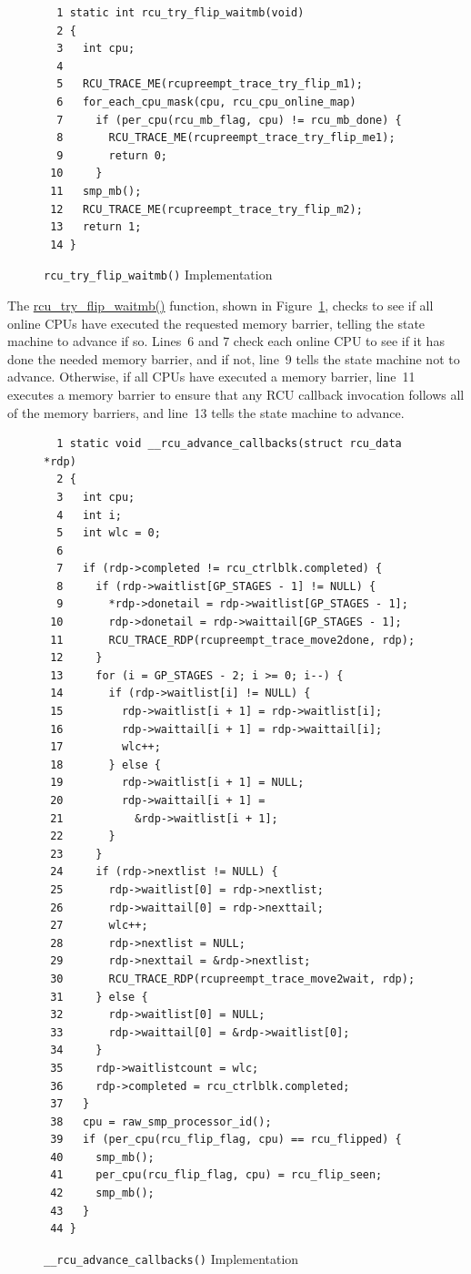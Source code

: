 \begin{figure}[tbp]
{ \scriptsize
\begin{verbatim}
  1 static int rcu_try_flip_waitmb(void)
  2 {
  3   int cpu;
  4
  5   RCU_TRACE_ME(rcupreempt_trace_try_flip_m1);
  6   for_each_cpu_mask(cpu, rcu_cpu_online_map)
  7     if (per_cpu(rcu_mb_flag, cpu) != rcu_mb_done) {
  8       RCU_TRACE_ME(rcupreempt_trace_try_flip_me1);
  9       return 0;
 10     }
 11   smp_mb();
 12   RCU_TRACE_ME(rcupreempt_trace_try_flip_m2);
 13   return 1;
 14 }
\end{verbatim}
}
\caption{{\tt rcu\_try\_flip\_waitmb()} Implementation}
\label{fig:app:rcuimpl:rcu_try_flip_waitmb() Implementation}
\end{figure}

The \url{rcu_try_flip_waitmb()} function, shown in
Figure~\ref{fig:app:rcuimpl:rcu_try_flip_waitmb() Implementation},
checks to see
if all online CPUs have executed the requested memory barrier,
telling the state machine to advance if so.
Lines~6 and 7 check each online CPU to see if it has
done the needed memory barrier, and if not, line~9 tells
the state machine not to advance.
Otherwise, if all CPUs have executed a memory barrier, line~11
executes a memory barrier to ensure that any RCU callback invocation
follows all of the memory barriers, and line~13 tells the
state machine to advance.

\begin{figure}[tbp]
{ \scriptsize
\begin{verbatim}
  1 static void __rcu_advance_callbacks(struct rcu_data *rdp)
  2 {
  3   int cpu;
  4   int i;
  5   int wlc = 0;
  6
  7   if (rdp->completed != rcu_ctrlblk.completed) {
  8     if (rdp->waitlist[GP_STAGES - 1] != NULL) {
  9       *rdp->donetail = rdp->waitlist[GP_STAGES - 1];
 10       rdp->donetail = rdp->waittail[GP_STAGES - 1];
 11       RCU_TRACE_RDP(rcupreempt_trace_move2done, rdp);
 12     }
 13     for (i = GP_STAGES - 2; i >= 0; i--) {
 14       if (rdp->waitlist[i] != NULL) {
 15         rdp->waitlist[i + 1] = rdp->waitlist[i];
 16         rdp->waittail[i + 1] = rdp->waittail[i];
 17         wlc++;
 18       } else {
 19         rdp->waitlist[i + 1] = NULL;
 20         rdp->waittail[i + 1] =
 21           &rdp->waitlist[i + 1];
 22       }
 23     }
 24     if (rdp->nextlist != NULL) {
 25       rdp->waitlist[0] = rdp->nextlist;
 26       rdp->waittail[0] = rdp->nexttail;
 27       wlc++;
 28       rdp->nextlist = NULL;
 29       rdp->nexttail = &rdp->nextlist;
 30       RCU_TRACE_RDP(rcupreempt_trace_move2wait, rdp);
 31     } else {
 32       rdp->waitlist[0] = NULL;
 33       rdp->waittail[0] = &rdp->waitlist[0];
 34     }
 35     rdp->waitlistcount = wlc;
 36     rdp->completed = rcu_ctrlblk.completed;
 37   }
 38   cpu = raw_smp_processor_id();
 39   if (per_cpu(rcu_flip_flag, cpu) == rcu_flipped) {
 40     smp_mb();
 41     per_cpu(rcu_flip_flag, cpu) = rcu_flip_seen;
 42     smp_mb();
 43   }
 44 }
\end{verbatim}
}
\caption{{\tt \_\_rcu\_advance\_callbacks()} Implementation}
\label{fig:app:rcuimpl:__rcu_advance_callbacks() Implementation}
\end{figure}

